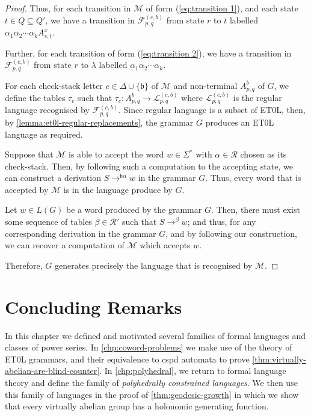 \begin{proof}
	Thus, for each transition in $\mathcal{M}$ of form (\ref{eq:transition 1}), and each state $t\in Q \subseteq Q'$, we have a transition in $\mathcal{F}_{p,q}^{(c,b)}$ from state $r$ to $t$ labelled $\alpha_1 \alpha_2 \cdots \alpha_k A_{s,t}^{x}$.
	
	Further, for each transition of form (\ref{eq:transition 2}), we have a transition in $\mathcal{F}_{p,q}^{(c,b)}$ from state $r$ to $\lambda$ labelled $\alpha_1 \alpha_2 \cdots \alpha_k$.
	
	For each check-stack letter $c \in \Delta \cup\{\mathfrak{b}\}$ of $\mathcal{M}$ and non-terminal $A_{p,q}^b$ of $G$, we define the tables $\tau_c$ such that $\tau_c \colon A_{p,q}^{b} \to \mathcal{L}_{p,q}^{(c,b)}$ where $\mathcal{L}_{p,q}^{(c,b)}$ is the regular language recognised by $\mathcal{F}_{p,q}^{(c,b)}$.
	Since regular language is a subset of ET0L, then, by \cref{lemma:et0l-regular-replacements}, the grammar $G$ produces an ET0L language as required.
	
	
	Suppose that $\mathcal{M}$ is able to accept the word $w \in \Sigma^*$ with $\alpha \in \mathcal{R}$ chosen as its check-stack.
	Then, by following such a computation to the accepting state, we can construct a derivation $S \to^{\mathfrak{b}\alpha} w$ in the grammar $G$.
	Thus, every word that is accepted by $\mathcal{M}$ is in the language produce by $G$.
	
	Let $w\in L(G)$ be a word produced by the grammar $G$.
	Then, there must exist some sequence of tables $\beta \in \mathcal{R}'$ such that $S \to^{\beta} w$; and thus, for any corresponding derivation in the grammar $G$, and by following our construction, we can recover a computation of $\mathcal{M}$ which accepts $w$.
	
	Therefore, $G$ generates precisely the language that is recognised by $\mathcal{M}$.
\end{proof}

\section{Concluding Remarks}\label{sec:formal-lang/concluding}

In this chapter we defined and motivated several families of formal languages and classes of power series.
In \cref{chp:coword-problems} we make use of the theory of ET0L grammars, and their equivalence to cspd automata to prove \cref{thm:virtually-abelian-are-blind-counter}.
In \cref{chp:polyhedral}, we return to formal language theory and define the family of \emph{polyhedrally constrained languages}.
We then use this family of languages in the proof of \cref{thm:geodesic-growth} in which we show that every virtually abelian group has a holonomic generating function.
